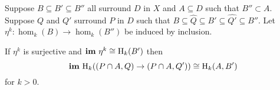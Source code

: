\begin{theorem}\label{thm:separate_iso}
  Suppose $B\subseteq B'\subseteq B''$ all surround $D$ in $X$ and $A\subseteq D$ such that $B''\subset A$.
  Suppose $Q$ and $Q'$ surround $P$ in $D$ such that $B\subseteq \hat{Q} \subseteq B'\subseteq \hat{Q'}\subseteq B''$.
  Let $\eta^k : \hom_k(B)\to \hom_k(B'')$ be induced by inclusion.

  If $\eta^k$ is surjective and $\mathbf{im}~\eta^k\cong \mathrm{H}_k(B')$ then
  \[\mathbf{im}~\mathrm{H}_k((P\cap A, Q)\to (P\cap A, Q'))\cong \mathrm{H}_k(A, B')\]
  for $k > 0$.
\end{theorem}
